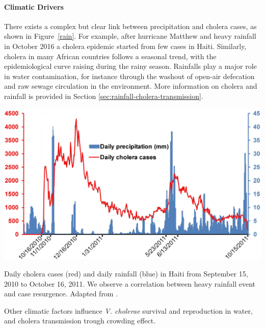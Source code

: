 \paragraph{Climatic Drivers} There exists a complex but clear link between precipitation and cholera cases, as shown in Figure~\ref{rain}. For example, after hurricane Matthew and heavy rainfall in October 2016 a cholera epidemic started from few cases in Haiti\cite{Rinaldo:Reassessment20102011:2012, Gaudart:SpatioTemporalDynamicsCholera:2013}. Similarly, cholera in many African countries follows a seasonal trend, with the epidemiological curve raising during the rainy season\cite{Baracchini:SeasonalityCholeraDynamics:2017,Pascual:CholeraDynamicsNinoSouthern:2000}.  Rainfalls play a major role in water contamination, for instance through the washout of open-air defecation and raw sewage circulation in the environment. More information on cholera and rainfall is provided in Section \ref{sec:rainfall-cholera-transmission}.

\begin{marginfigure}
\centering
\includegraphics[width=\textwidth]{fig/cholera-rainfall.png}
\caption[Daily cholera cases and rainfall in Haiti]{Daily cholera cases (red) and daily rainfall (blue) in Haiti from September 15, 2010 to October
16, 2011. We observe a correlation between heavy rainfall event and case resurgence. Adapted from .}
\label{rain}
\end{marginfigure}

Other climatic factors influence \textit{V. cholerae} survival and reproduction in water, and cholera transmission trough crowding effect\cite{Koelle:RefractoryPeriodsClimate:2005}.

